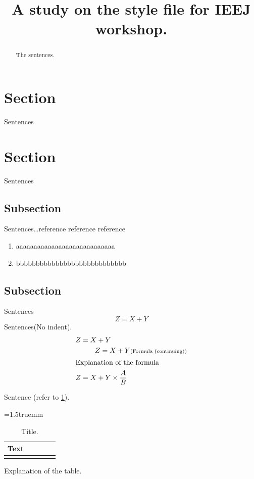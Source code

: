 \documentclass[english,fleqn]{ieej-tec2}%
\title{A study on the style file for IEEJ workshop.}
\begin{document}
\maketitle
%
\begin{abstract}
The sentences.
\end{abstract}
%
\section{Section}
Sentences

\section{Section}
Sentences

\subsection{Subsection}
Sentences\dots reference\cite{IEEJformat} reference\cite{bib2,bib3} reference\cite{bib4,bib5,bib6,bib7}

\begin{enumerate}
\item
aaaaaaaaaaaaaaaaaaaaaaaaaaaa
\item
bbbbbbbbbbbbbbbbbbbbbbbbbbbb
\end{enumerate}

\subsection{Subsection}
Sentences
%
\begin{equation}
Z = X + Y
\end{equation}
%
Sentences(No indent).
%
\begin{align}
Z &= X + Y \notag\\
& \qquad Z = X + Y \text{\scriptsize (Formula (continuing))} \\
\intertext{Explanation of the formula%
}
Z &= X + Y \times \frac AB
\end{align}

Sentence (refer to \tablename\ref{tab:example}).

\begin{table}[b]
\centering
\caption{Title.}
\label{tab:example}
\tabcolsep=1.5truemm
\begin{tabular}{|c|c|c|c|c|}\hline
Text & \hspace{4zw} &  \hspace{4zw} &  \hspace{4zw} &  \hspace{4zw} \\\hline
& & & & \\\hline
\end{tabular}
\par
\begin{minipage}{68truemm}
\scriptsize%
Explanation of the table.
\end{minipage}
\end{table}
\end{document}
